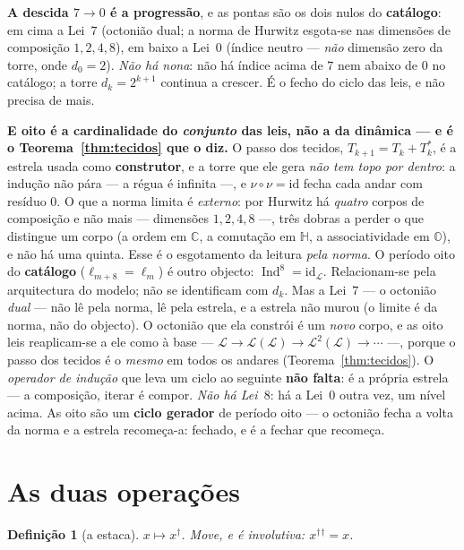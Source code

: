 \documentclass[11pt,a4paper]{article}
\newtheorem{definicao}[teorema]{Definição}
\newcommand{\dg}{^{\dagger}}
\begin{document}
\noindent \textbf{A descida $7\to0$ é a progressão}, e as pontas são os dois nulos do
\textbf{catálogo}: em cima a Lei~$7$ (octonião dual; a norma de Hurwitz esgota-se nas
dimensões de composição $1,2,4,8$), em baixo a Lei~$0$ (índice neutro --- \emph{não}
dimensão zero da torre, onde $d_0=2$). \emph{Não há nona}: não há índice acima de $7$
nem abaixo de $0$ no catálogo; a torre $d_k=2^{k+1}$ continua a crescer. É o fecho do
ciclo das leis, e não precisa de mais.

\smallskip
\noindent \textbf{E oito é a cardinalidade do \emph{conjunto} das leis, não a da dinâmica --- e é o
Teorema~\ref{thm:tecidos} que o diz.} O passo dos tecidos, $T_{k+1}=T_k+T_k^{*}$, é a estrela usada como
\textbf{construtor}, e a torre que ele gera \emph{não tem topo por dentro}: a indução não pára --- a régua
é infinita ---, e $\nu\circ\nu=\mathrm{id}$ fecha cada andar com resíduo $0$. O que a norma limita é
\emph{externo}: por Hurwitz há \emph{quatro} corpos de composição e não mais ---
dimensões $1,2,4,8$ ---, três dobras a perder o que distingue um corpo (a ordem em $\mathbb{C}$, a comutação
em $\mathbb{H}$, a associatividade em $\mathbb{O}$), e não há uma quinta. Esse é o esgotamento da
leitura \emph{pela norma}. O período oito do \textbf{catálogo} ($\ell_{m+8}=\ell_m$) é outro objecto:
$\operatorname{Ind}^{8}=\mathrm{id}_{\mathcal L}$. Relacionam-se pela arquitectura do modelo; não se
identificam com $d_k$. Mas a Lei~$7$ --- o octonião \emph{dual} --- não lê pela
norma, lê pela estrela, e a estrela não murou (o limite é da norma, não do objecto). O octonião que ela
constrói é um \emph{novo} corpo, e as oito leis reaplicam-se a ele como à base ---
$\mathcal L\to\mathcal L(\mathcal L)\to\mathcal L^2(\mathcal L)\to\cdots$ ---, porque o passo dos tecidos é
o \emph{mesmo} em todos os andares (Teorema~\ref{thm:tecidos}). O \emph{operador de indução} que leva um
ciclo ao seguinte \textbf{não falta}: é a própria estrela --- a composição, iterar é compor. \emph{Não há
Lei~$8$}: há a Lei~$0$ outra vez, um nível acima. As oito são um \textbf{ciclo gerador} de período oito
--- o octonião fecha a volta da norma e a estrela recomeça-a: fechado, e é a fechar que recomeça.

\section{As duas operações}

\begin{definicao}[a estaca]
$x\mapsto x\dg$. Move, e é involutiva: $x\dg{}\dg=x$.
\end{definicao}
\end{document}
